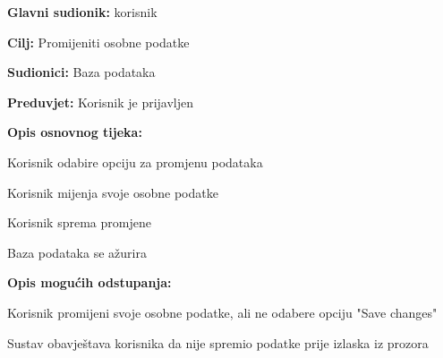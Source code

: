 					\noindent {}
					\begin{packed_item}
	
						\item \textbf{Glavni sudionik: }korisnik
						\item  \textbf{Cilj:} Promijeniti osobne podatke
						\item  \textbf{Sudionici:} Baza podataka
						\item  \textbf{Preduvjet:} Korisnik je prijavljen
						\item  \textbf{Opis osnovnog tijeka:}
						
						\item[] \begin{packed_enum}
	
							\item Korisnik odabire opciju za promjenu podataka
							\item Korisnik mijenja svoje osobne podatke
							\item Korisnik sprema promjene
							\item Baza podataka se ažurira

						\end{packed_enum}
						
						\item  \textbf{Opis mogućih odstupanja:}
						
						\item[] \begin{packed_item}
	
							\item[2.a] Korisnik promijeni svoje osobne podatke, ali ne odabere opciju "Save changes"
							\item[] \begin{packed_enum}
								
								\item Sustav obavještava korisnika da nije spremio podatke prije izlaska iz prozora
								
							\end{packed_enum}
							
						\end{packed_item}
					\end{packed_item}
					
